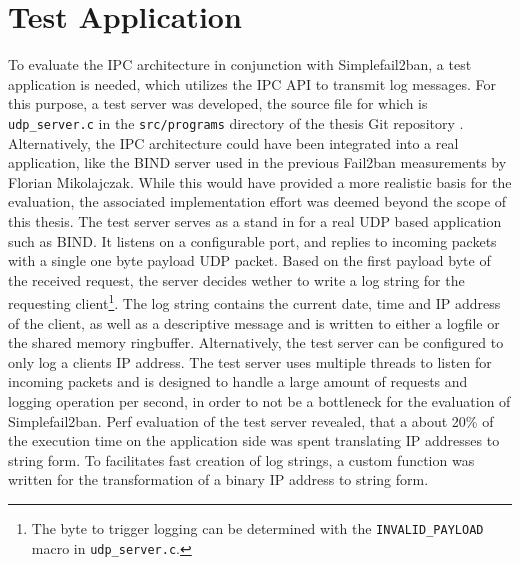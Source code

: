 \section{Test Application}

To evaluate the \ac{IPC} architecture in conjunction with Simplefail2ban, a test application is needed, which utilizes the \ac{IPC} API to transmit log
messages. For this purpose, a test server was developed, the source file for which is \texttt{udp\_server.c} in the \texttt{src/programs} directory of the thesis Git repository \cite{gitlab}. 
Alternatively, the \ac{IPC} architecture could have been integrated into a real application, like the BIND server used in the previous Fail2ban measurements by Florian Mikolajczak. While this would have provided a more 
realistic basis for the evaluation, the associated implementation effort was deemed beyond the scope of this thesis. 
The test server serves as a stand in for a real \ac{UDP} based application such as BIND. It listens on a configurable port,
and replies to incoming packets with a single one byte payload UDP packet. Based on the first payload byte of the received request,
the server decides wether to write a log string for the requesting client\footnote{The byte to trigger logging can be determined with the \texttt{INVALID\_PAYLOAD} macro in \texttt{udp\_server.c}.}.
The log string contains the current date, time and \ac{IP} address of the client, as well as a descriptive message and is written to either a logfile or the shared memory ringbuffer.  
Alternatively, the test server can be configured to only log a clients \ac{IP} address. The test server uses multiple threads to listen for incoming packets 
and is designed to handle a large amount of requests and logging operation per second, in order to not be a bottleneck for the evaluation of Simplefail2ban. 
Perf \cite{perf} evaluation of the test server revealed, that a about 20\% of the execution time on the application side was spent translating \ac{IP} addresses to string form.  
To facilitates fast creation of log strings, a custom function was written for the transformation of a binary \ac{IP} address to string form. 
